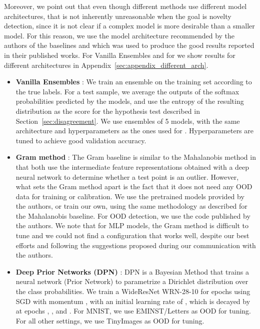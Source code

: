 Moreover, we point out that even though different methods use different model
architectures, that is not inherently unreasonable when the goal is novelty
detection, since it is not clear if a complex model is more desirable than a
smaller model. For this reason, we use the model architecture recommended by the
authors of the baselines and which was used to produce the good results reported
in their published works. For Vanilla Ensembles and for  we show
results for different architectures in
Appendix~\ref{sec:appendix_different_arch}.

\begin{itemize}



  \item \textbf{Vanilla Ensembles} \citep{balaji}: We train an ensemble on the
    training set according to the true labels. For a test sample, we average the
    outputs of the softmax probabilities predicted by the models, and use the
    entropy of the resulting distribution as the score for the hypothesis test
    described in Section~\ref{sec:disagreement}. We use ensembles of 5 models,
    with the same architecture and hyperparameters as the ones used for
    . Hyperparameters are tuned to achieve good validation accuracy.

  \item \textbf{Gram method} \citep{gram_ood}: The Gram baseline is similar to
    the Mahalanobis method in that both use the intermediate feature
    representations obtained with a deep neural network to determine whether a
    test point is an outlier. However, what sets the Gram method apart is the
    fact that it does not need any OOD data for training or calibration. We use
    the pretrained models provided by the authors, or train our own, using the
    same methodology as described for the Mahalanobis baseline. For OOD
    detection, we use the code published by the authors. We note that for MLP
    models, the Gram method is difficult to tune and we could not find a
    configuration that works well, despite our best efforts and following the
    suggestions proposed during our communication with the authors.


  \item \textbf{Deep Prior Networks (DPN)} \citep{dpn}: DPN is a Bayesian Method
    that trains a neural network (Prior Network) to parametrize a Dirichlet
    distribution over the class probabilities.  We train a WideResNet WRN-28-10
    for  epochs using SGD with momentum , with an initial learning
    rate of , which is decayed by  at epochs , , and .
    For MNIST, we use EMINST/Letters as OOD for tuning. For all other settings,
    we use TinyImages as OOD for tuning.


\end{itemize}
